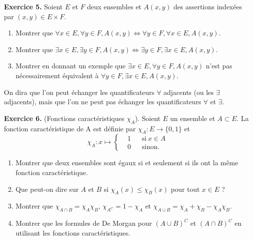 \documentclass[a4paper, 10pt]{report}
\begin{document}
	\vspace{5mm}
	\noindent
	\textbf{Exercice 5.} Soient $E$ et $F$ deux ensembles et
	$A(x, y)$ des assertions indexées par $(x, y) \in E \times F$.
	
	\begin{enumerate}[label=(\roman*)]
		\item Montrer que $\forall x \in E, \forall y \in F, A(x, y)
			\iff \forall y \in F, \forall x \in E, A(x, y)$.
		\item Montrer que $\exists x \in E, \exists y \in F, A(x, y)
			\iff \exists y \in F, \exists x \in E, A(x, y)$.
		\item Montrer en donnant un exemple que $\exists x \in E,
			\forall y \in F, A(x, y)$ n'est pas nécessairement
			équivalent à $\forall y \in F, \exists x \in E, A(x, y)$.
	\end{enumerate}
	On dira que l'on peut échanger les quantificateurs $\forall$
	adjacents (ou les $\exists$ adjacents), mais que l'on ne peut
	pas échanger les quantificateurs $\forall$ et $\exists$. 
	
	\newpage
	
	\fancyhf{}
	\renewcommand{\headrule}
	{\rule{\textwidth}{0pt}}
	
	\noindent
	\textbf{Exercice 6.} (Fonctions caractéristiques $\chi_A$).
	Soient $E$ un ensemble et $A \subset E$. La fonction
	caractéristique de A est définie par $\chi_A : E \to \{0, 1\}$ et
	\[
		\chi_A : x \mapsto \left\{
		\begin{aligned}
			&1 & &\text{si}\ x \in A\\
			&0 & &\text{sinon.}
		\end{aligned}
		\right.
	\]
	
	\begin{enumerate}[label=(\roman*)]
		\item Montrer que deux ensembles sont égaux si et seulement
		si ils ont la même fonction caractéristique.
		\item Que peut-on dire sur $A$ et $B$ si
		$\chi_A(x) \leq \chi_B(x)$ pour tout $x \in E$ ?
		\item Montrer que $\chi_{A \cap B} = \chi_A \chi_B$,
		$\chi_{A^C} = 1 - \chi_A$ et
		$\chi_{A \cup B} = \chi_A + \chi_B - \chi_A \chi_B$.
		\item Montrer que les formules de De Morgan pour $(A \cup B)^C$
		et $(A \cap B)^C$ en utilisant les fonctions caractéristiques.
	\end{enumerate}
	
\end{document}

